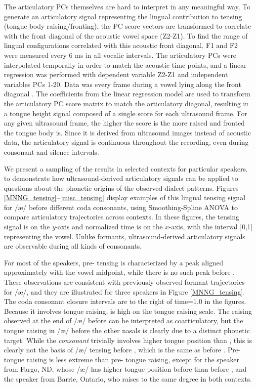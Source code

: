 \documentclass[output=paper]{LSP/langsci}
\begin{document}
The articulatory PCs themselves are hard to interpret in any meaningful way.  To generate an articulatory signal representing the lingual contribution to tensing (tongue body raising/fronting), the PC score vectors are transformed to correlate with the front diagonal of the acoustic vowel space (Z2-Z1). To find the range of lingual configurations correlated with this acoustic front diagonal, F1 and F2 were measured every 6 ms in all vocalic intervals.  The articulatory PCs were interpolated temporally in order to match the acoustic time points, and a linear regression was performed with dependent variable Z2-Z1 and independent variables PCs 1-20. Data was every frame during a vowel lying along the front diagonal . The coefficients from the linear regression model are used to transform the articulatory PC score matrix to match the articulatory diagonal, resulting in a tongue height signal composed of a single score for each ultrasound frame. For any given ultrasound frame, the higher the score is the more raised and fronted the tongue body is.  Since it is derived from ultrasound images instead of acoustic data, the articulatory signal is continuous throughout the recording, even during consonant and silence intervals.

We present a sampling of the results in selected contexts for particular speakers, to demonstrate how ultrasound-derived articulatory signals can be applied to questions about the phonetic origins of the observed dialect patterns.  Figures \ref{MNNG_tensing}--\ref{misc_tensing} display examples of this lingual tensing signal for /æ/ before different coda consonants, using Smoothing-Spline ANOVA \citep{gu_smoothing_2002} to compare articulatory trajectories across contexts. In these figures, the tensing signal is on the $y$-axis and normalized time is on the $x$-axis, with the interval [0,1] representing the vowel.  Unlike formants, ultrasound-derived articulatory signals are observable during all kinds of consonants.

For most of the speakers, pre- tensing is characterized by a peak aligned approximately with the vowel midpoint, while there is no such peak before .  These observations are consistent with previously observed formant trajectories for /æ/, and they are illustrated for three speakers in Figure \ref{MNNG_tensing}.  The coda consonant closure intervals are to the right of time=1.0 in the figures. Because it involves tongue raising,  is high on the tongue raising scale. The raising observed at the end of /æ/ before  can be interpreted as coarticulatory, but the tongue raising in /æ/ before the other nasals is clearly due to a distinct phonetic target.  While the \textit{consonant}  trivially involves higher tongue position than , this is clearly not the basis of /æ/ tensing before , which is the same as before . Pre- tongue raising is less extreme than pre- tongue raising, except for the speaker from Fargo, ND, whose /æ/ has higher tongue position before  than before , and the speaker from Barrie, Ontario, who raises to the same degree in both contexts.
\end{document}
